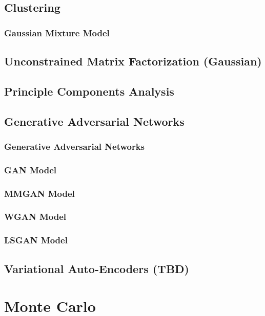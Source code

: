 \documentclass{article}
\begin{document}
\subsection{Clustering}
\subsubsection{Gaussian Mixture Model}

\subsection{Unconstrained Matrix Factorization (Gaussian)}

\subsection{Principle Components Analysis}

\subsection{Generative Adversarial Networks}
\subsubsection{Generative Adversarial Networks}
\subsubsection{GAN Model}
\subsubsection{MMGAN Model}
\subsubsection{WGAN Model}
\subsubsection{LSGAN Model}

\subsection{Variational Auto-Encoders (TBD)}


\section{Monte Carlo}
\end{document}
